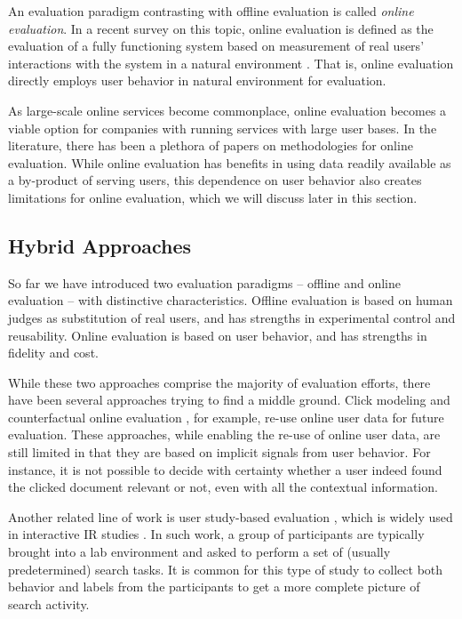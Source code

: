 An evaluation paradigm contrasting with offline evaluation is called \textit{online evaluation}. In a recent survey on this topic, online evaluation is defined as the evaluation of a fully functioning system based on measurement of real users' interactions with the system in a natural environment \citep{INR-XYZ}. That is, online evaluation directly employs user behavior in natural environment for evaluation.

As large-scale online services become commonplace, online evaluation becomes a viable option for companies with running services with large user bases. In the literature, there has been a plethora of papers on methodologies for online evaluation. While online evaluation has benefits in using data readily available as a by-product of serving users, this dependence on user behavior also creates limitations for online evaluation, which we will discuss later in this section.

\subsection{Hybrid Approaches}

So far we have introduced two evaluation paradigms -- offline and online evaluation -- with distinctive characteristics. Offline evaluation is based on human judges as substitution of real users, and has strengths in experimental control and reusability. Online evaluation is based on user behavior, and has strengths in fidelity and cost.


While these two approaches comprise the majority of evaluation efforts, there have been several approaches trying to find a middle ground. Click modeling \citep{chuklin2015click} and counterfactual online evaluation \citep{Li:2015, li2010contextual}, for example, re-use online user data for future evaluation. These approaches, while enabling the re-use of online user data, are still limited in that they are based on implicit signals from user behavior. For instance, it is not possible to decide with certainty whether a user indeed found the clicked document relevant or not, even with all the contextual information.


Another related line of work is user study-based evaluation \citep{Bron:2013, Liu:2014, Shah:2011}, which is widely used in interactive IR studies \citep{kelly2009methods}. In such work, a group of participants are typically brought into a lab environment and asked to perform a set of (usually predetermined) search tasks. It is common for this type of study to collect both behavior and labels from the participants to get a more complete picture of search activity. 

